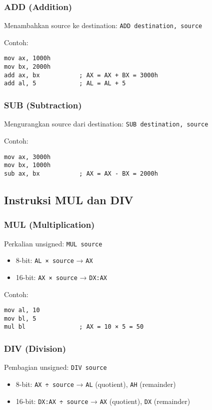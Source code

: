 \subsubsection{ADD (Addition)}
Menambahkan source ke destination: \texttt{ADD destination, source}

Contoh:
\begin{verbatim}
mov ax, 1000h
mov bx, 2000h
add ax, bx           ; AX = AX + BX = 3000h
add al, 5            ; AL = AL + 5
\end{verbatim}

\subsubsection{SUB (Subtraction)}
Mengurangkan source dari destination: \texttt{SUB destination, source}

Contoh:
\begin{verbatim}
mov ax, 3000h
mov bx, 1000h
sub ax, bx           ; AX = AX - BX = 2000h
\end{verbatim}

\subsection{Instruksi MUL dan DIV}
\subsubsection{MUL (Multiplication)}
Perkalian unsigned: \texttt{MUL source}

\begin{itemize}
    \item 8-bit: \texttt{AL × source} → \texttt{AX}
    \item 16-bit: \texttt{AX × source} → \texttt{DX:AX}
\end{itemize}

Contoh:
\begin{verbatim}
mov al, 10
mov bl, 5
mul bl               ; AX = 10 × 5 = 50
\end{verbatim}

\subsubsection{DIV (Division)}
Pembagian unsigned: \texttt{DIV source}

\begin{itemize}
    \item 8-bit: \texttt{AX ÷ source} → \texttt{AL} (quotient), \texttt{AH} (remainder)
    \item 16-bit: \texttt{DX:AX ÷ source} → \texttt{AX} (quotient), \texttt{DX} (remainder)
\end{itemize}

